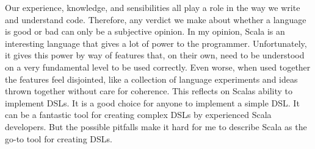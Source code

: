 Our experience, knowledge, and sensibilities all play a role in the way we write and understand code.
Therefore, any verdict we make about whether a language is good or bad can only be a subjective opinion.
In my opinion, Scala is an interesting language that gives a lot of power to the programmer.
Unfortunately, it gives this power by way of features that, on their own, need to be understood on a very fundamental level to be used correctly.
Even worse, when used together the features feel disjointed, like a collection of language experiments and ideas thrown together without care for coherence.
This reflects on Scalas ability to implement DSLs.
It is a good choice for anyone to implement a simple DSL.
It can be a fantastic tool for creating complex DSLs by experienced Scala developers.
But the possible pitfalls make it hard for me to describe Scala as the go-to tool for creating DSLs.
